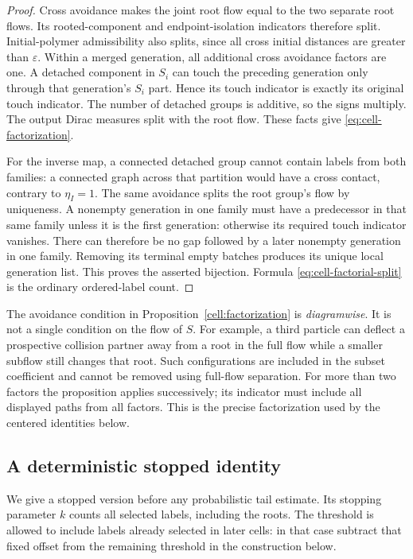 \begin{proof}
Cross avoidance makes the joint root flow equal to the two separate
root flows.  Its rooted-component and endpoint-isolation indicators
therefore split.  Initial-polymer admissibility also splits, since
all cross initial distances are greater than $\varepsilon$.
Within a merged generation, all additional cross avoidance factors
are one.  A detached component in $S_i$ can touch the preceding
generation only through that generation's $S_i$ part.  Hence its
touch indicator is exactly its original touch indicator.  The
number of detached groups is additive, so the signs multiply.
The output Dirac measures split with the root flow.  These facts
give \eqref{eq:cell-factorization}.

For the inverse map, a connected detached group cannot contain labels
from both families: a connected graph across that partition would
have a cross contact, contrary to $\eta_I=1$.  The same avoidance
splits the root group's flow by uniqueness.  A nonempty generation
in one family must have
a predecessor in that same family unless it is the first generation:
otherwise its required touch indicator vanishes.  There can therefore
be no gap followed by a later nonempty generation in one family.
Removing its terminal empty batches produces its unique local
generation list.  This proves the asserted bijection.  Formula
\eqref{eq:cell-factorial-split} is the ordinary ordered-label count.
\end{proof}

The avoidance condition in Proposition~\ref{cell:factorization} is
\emph{diagramwise}.  It is not a single condition on the flow of $S$.
For example, a third particle can deflect a prospective collision
partner away from a root in the full flow while a smaller subflow
still changes that root.  Such configurations are included in the
subset coefficient and cannot be removed using full-flow separation.
For more than two factors the proposition applies successively; its
indicator must include all displayed paths from all factors.  This
is the precise factorization used by the centered identities below.

\subsection{A deterministic stopped identity}

We give a stopped version before any probabilistic tail estimate.
Its stopping parameter $k$ counts all selected labels, including
the roots.  The threshold is allowed to include labels already
selected in later cells: in that case subtract that fixed offset
from the remaining threshold in the construction below.

